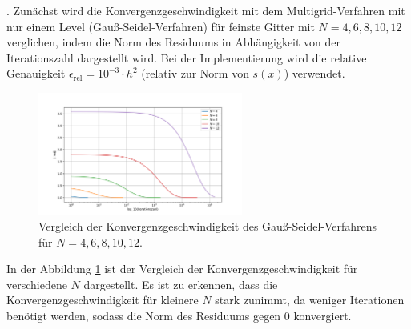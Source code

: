 \documentclass[11pt,a4paper]{article}
\begin{document}
. Zunächst wird die Konvergenzgeschwindigkeit mit dem Multigrid-Verfahren mit nur einem Level (Gauß-Seidel-Verfahren) für feinste Gitter mit $N = 4,6,8,10,12$ verglichen, indem die Norm des Residuums in Abhängigkeit von der
Iterationszahl dargestellt wird. Bei der Implementierung wird die relative Genauigkeit $\epsilon_{\mathrm{rel}} = 10^{-3} \cdot h^2$ (relativ zur Norm von $s(x)$) verwendet.
\begin{figure}[h]
    \centering
    \includegraphics[width=0.6\textwidth]{h2_N_comparison_1}
    \caption[Vergleich der Konvergenzgeschwindigkeit des Gauß-Seidel-Verfahrens für $N = 4,6,8,10,12$.]{Vergleich der Konvergenzgeschwindigkeit des Gauß-Seidel-Verfahrens für $N = 4,6,8,10,12$.}\label{fig:h2_N_comparison_1}
\end{figure} In der Abbildung \ref{fig:h2_N_comparison_1} ist der Vergleich der Konvergenzgeschwindigkeit für verschiedene $N$ dargestellt. Es ist zu erkennen, dass
die Konvergenzgeschwindigkeit für kleinere $N$ stark zunimmt, da weniger Iterationen benötigt werden, sodass die Norm des Residuums gegen $0$ konvergiert.\\
\end{document}
